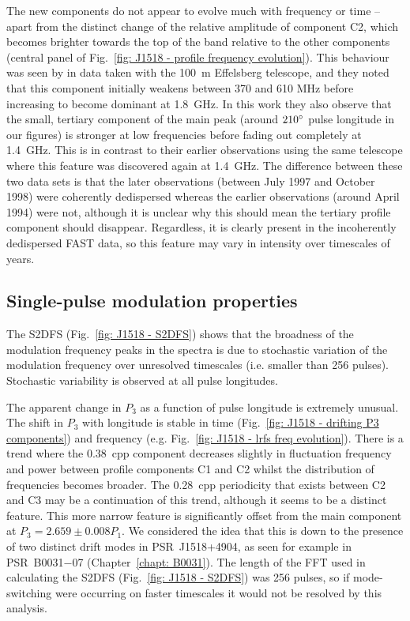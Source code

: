 The new components do not appear to evolve much with frequency or time -- apart from the distinct change of the relative amplitude of component C2, which becomes brighter towards the top of the band relative to the other components (central panel of Fig.~\ref{fig: J1518 - profile frequency evolution}). This behaviour was seen by \citet{KLL+1999} in data taken with the 100~m Effelsberg telescope, and they noted that this component initially weakens between 370 and 610 MHz before increasing to become dominant at 1.8~GHz. In this work they also observe that the small, tertiary component of the main peak (around $210^\circ$ pulse longitude in our figures) is stronger at low frequencies before fading out completely at 1.4~GHz. This is in contrast to their earlier observations using the same telescope \citep{KXL+1998} where this feature was discovered again at 1.4~GHz. The difference between these two data sets is that the later observations (between July 1997 and October 1998) were coherently dedispersed whereas the earlier observations (around April 1994) were not, although it is unclear why this should mean the tertiary profile component should disappear. Regardless, it is clearly present in the incoherently dedispersed FAST data, so this feature may vary in intensity over timescales of years. 










\subsection{Single-pulse modulation properties}
\label{sec: J1518 - discussion - funky P3}

The S2DFS (Fig.~\ref{fig: J1518 - S2DFS}) shows that the broadness of the modulation frequency peaks in the spectra is due to stochastic variation of the modulation frequency over unresolved timescales (i.e. smaller than 256 pulses). Stochastic variability is observed at all pulse longitudes.

The apparent change in $P_3$ as a function of pulse longitude is extremely unusual. The shift in $P_3$ with longitude is stable in time (Fig.~\ref{fig: J1518 - drifting P3 components}) and frequency (e.g. Fig.~\ref{fig: J1518 - lrfs freq evolution}). There is a trend where the 0.38~cpp component decreases slightly in fluctuation frequency and power between profile components C1 and C2 whilst the distribution of frequencies becomes broader. The 0.28~cpp periodicity that exists between C2 and C3 may be a continuation of this trend, although it seems to be a distinct feature. This more narrow feature is significantly offset from the main component at $P_3 = 2.659\pm0.008P_1$. We considered the idea that this is down to the presence of two distinct drift modes in PSR~J1518+4904, as seen for example in PSR~B0031$-$07 (Chapter~\ref{chapt: B0031}). The length of the FFT used in calculating the S2DFS (Fig.~\ref{fig: J1518 - S2DFS}) was 256 pulses, so if mode-switching were occurring on faster timescales it would not be resolved by this analysis.


